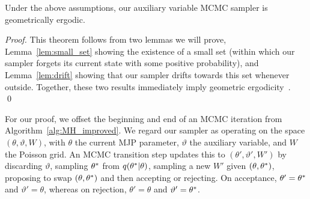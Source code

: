 

\begin{theorem}
Under the above assumptions, our auxiliary variable MCMC sampler is
geometrically ergodic.  \label{thm:geom_erg}
\end{theorem}
\begin{proof}
\noindent This theorem follows from two lemmas we will prove,
Lemma~\ref{lem:small_set} showing the existence of a small set (within
which our sampler forgets its
current state with some positive probability), and Lemma~\ref{lem:drift}
showing that our sampler drifts towards this set whenever
outside. Together, these two results immediately imply geometric
ergodicity~\citep[Theorems 15.0.1 and Lemma 15.2.8]{meyn2009}.
\qed
\end{proof}
For our proof, we offset the beginning and end of an MCMC iteration from 
Algorithm~\ref{alg:MH_improved}. We regard our sampler as operating on 
the space $(\theta,\vartheta,W)$,  with $\theta$ the current MJP 
parameter, $\vartheta$ the auxiliary variable, and $W$ the Poisson grid. 
An MCMC transition step
updates this to $(\theta',\vartheta',W')$ by discarding $\vartheta$, 
sampling $\theta^{*}$ from $q(\theta^{*}|\theta)$, sampling a new $W'$ given 
$(\theta,\theta^{*})$, proposing to swap $(\theta,\theta^{*})$ and then 
accepting or rejecting. On acceptance, $\theta' = \theta^{*}$ and
$\vartheta' = \theta$, whereas on rejection, $\theta'=\theta$ and 
$\vartheta'=\theta^{*}$.


